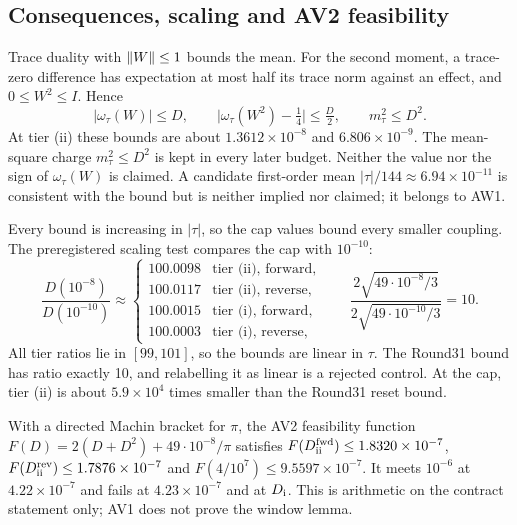 \subsection{Consequences, scaling and AV2 feasibility}
\label{sec:av1-consequences}
Trace duality with $\left\lVert W\right\rVert\le1$ bounds the mean. For the second moment, a
trace-zero difference has expectation at most half its trace norm against an
effect, and $0\le W^2\le I$. Hence
\begin{equation}
 |\omega_\tau(W)|\le D,\qquad
 \bigl|\omega_\tau(W^2)-\tfrac14\bigr|\le\tfrac D2,\qquad
 m_\tau^2\le D^2 .
 \label{eq:av1-consequences}
\end{equation}
At tier (ii) these bounds are about $1.3612\times10^{-8}$ and
$6.806\times10^{-9}$. The mean-square charge $m_\tau^2\le D^2$ is kept in
every later budget. Neither the value nor the sign of $\omega_\tau(W)$ is
claimed. A candidate first-order mean $|\tau|/144\approx6.94\times10^{-11}$ is
consistent with the bound but is neither implied nor claimed; it belongs to
AW1.

Every bound is increasing in $|\tau|$, so the cap values bound every smaller
coupling. The preregistered scaling test compares the cap with $10^{-10}$:
\begin{equation}
 \frac{D(10^{-8})}{D(10^{-10})}\approx
 \begin{cases}
 100.0098 & \text{tier (ii), forward},\\
 100.0117 & \text{tier (ii), reverse},\\
 100.0015 & \text{tier (i), forward},\\
 100.0003 & \text{tier (i), reverse},
 \end{cases}
 \qquad
 \frac{2\sqrt{49\cdot10^{-8}/3}}{2\sqrt{49\cdot10^{-10}/3}}=10 .
 \label{eq:av1-scaling}
\end{equation}
All tier ratios lie in $[99,101]$, so the bounds are linear in $\tau$. The
Round31 bound has ratio exactly 10, and relabelling it as linear is a rejected
control. At the cap, tier (ii) is about $5.9\times10^{4}$ times smaller than
the Round31 reset bound.

With a directed Machin bracket for $\pi$, the AV2 feasibility function
$F(D)=2(D+D^2)+49\cdot10^{-8}/\pi$ satisfies
$F(D_{\rm ii}^{\rm fwd})\le1.8320\times10^{-7}$,
$F(D_{\rm ii}^{\rm rev})\le1.7876\times10^{-7}$ and
$F(4/10^7)\le9.5597\times10^{-7}$. It meets $10^{-6}$ at $4.22\times10^{-7}$
and fails at $4.23\times10^{-7}$ and at $D_{\rm i}$. This is arithmetic on the
contract statement only; AV1 does not prove the window lemma.

